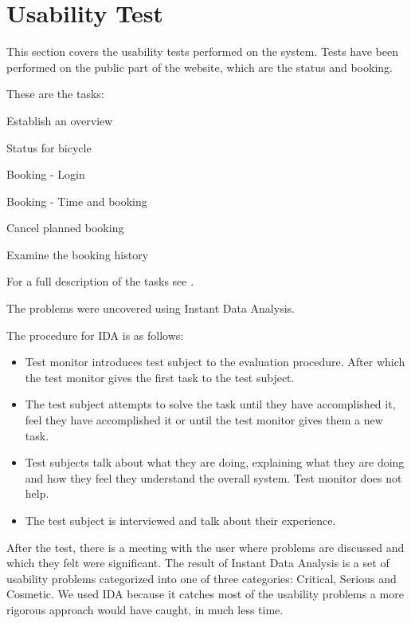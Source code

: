 \section{Usability Test}
This section covers the usability tests performed on the system.
Tests have been performed on the public part of the website, which are the status and booking.

These are the tasks:

\begin{description}[style=nextline]
\item[Task 1] Establish an overview
\item[Task 2] Status for bicycle
\item[Task 3] Booking - Login
\item[Task 4] Booking - Time and booking
\item[Task 5] Cancel planned booking
\item[Task 6] Examine the booking history
\end{description}
For a full description of the tasks see .

The problems were uncovered using Instant Data Analysis.

The procedure for IDA is as follows:

\begin{itemize}
\item Test monitor introduces test subject to the evaluation procedure. After which the test monitor gives the first task to the test subject.
\item The test subject attempts to solve the task until they have accomplished it, feel they have accomplished it or until the test monitor gives them a new task.
\item Test subjects talk about what they are doing, explaining what they are doing and how they feel they understand the overall system. Test monitor does not help.
\item The test subject is interviewed and talk about their experience.
\end{itemize}\citep{misc:usabilitytest}

After the test, there is a meeting with the user where problems are discussed and which they felt were significant.
The result of Instant Data Analysis is a set of usability problems categorized into one of three categories: Critical, Serious and Cosmetic.
We used IDA because it catches most of the usability problems a more rigorous approach would have caught, in much less time.


